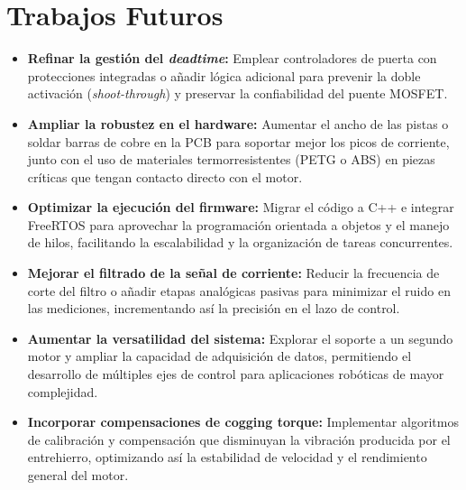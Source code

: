\documentclass[11pt]{report}
\begin{document}
\section*{Trabajos Futuros}
\begin{itemize}
	\item \textbf{Refinar la gestión del \emph{deadtime}:} Emplear controladores de puerta con protecciones integradas o añadir lógica adicional para prevenir la doble activación (\emph{shoot-through}) y preservar la confiabilidad del puente MOSFET.

	\item \textbf{Ampliar la robustez en el hardware:} Aumentar el ancho de las pistas o soldar barras de cobre en la PCB para soportar mejor los picos de corriente, junto con el uso de materiales termorresistentes (PETG o ABS) en piezas críticas que tengan contacto directo con el motor.

	\item \textbf{Optimizar la ejecución del firmware:} Migrar el código a C++ e integrar FreeRTOS para aprovechar la programación orientada a objetos y el manejo de hilos, facilitando la escalabilidad y la organización de tareas concurrentes.

	\item \textbf{Mejorar el filtrado de la señal de corriente:} Reducir la frecuencia de corte del filtro o añadir etapas analógicas pasivas para minimizar el ruido en las mediciones, incrementando así la precisión en el lazo de control.

	\item \textbf{Aumentar la versatilidad del sistema:} Explorar el soporte a un segundo motor y ampliar la capacidad de adquisición de datos, permitiendo el desarrollo de múltiples ejes de control para aplicaciones robóticas de mayor complejidad.

	\item \textbf{Incorporar compensaciones de cogging torque:} Implementar algoritmos de calibración y compensación que disminuyan la vibración producida por el entrehierro, optimizando así la estabilidad de velocidad y el rendimiento general del motor.
\end{itemize}

\href{https://www.youtube.com/watch?v=2yJgwwDcgV8}{\phantom{ASDF--------------------ASDF}}

\newpage
{}
\printbibliography

\end{document}
